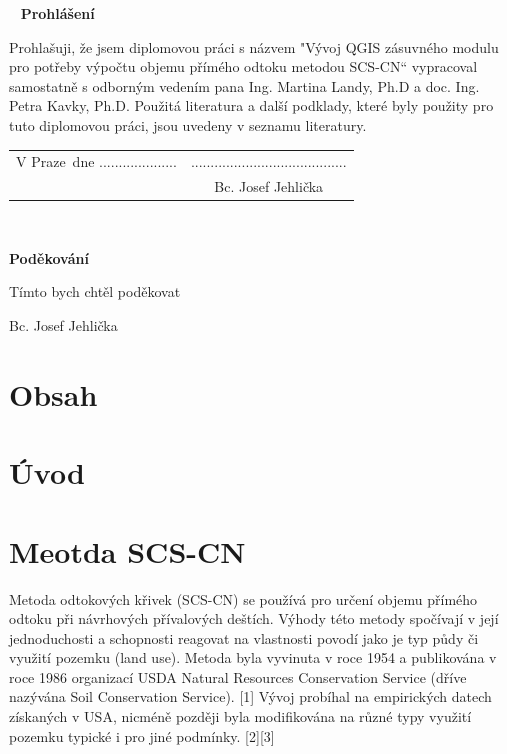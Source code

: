 \documentclass[a4paper,oneside,12pt]{book}
\newcommand{\tb}{\textbf} %
\newcommand{\autor}{Bc. Josef Jehlička}   %
\newcommand{\kde}{Praze} %
\newcommand{\prohlaseni}{Prohlašuji, že jsem diplomovou práci s názvem "Vývoj QGIS zásuvného modulu pro potřeby výpočtu objemu přímého odtoku metodou SCS-CN“ vypracoval samostatně s odborným vedením pana Ing. Martina Landy, Ph.D a doc. Ing. Petra Kavky, Ph.D. Použitá literatura a další podklady, které byly použity pro tuto diplomovou práci, jsou uvedeny v seznamu literatury. 
} %
\newcommand{\podekovani}{Tímto bych chtěl poděkovat } %
\begin{document}
\newpage %
\thispagestyle{empty}  %

~ %
\vfill %
\vspace{1em}
\tb{Prohlášení} %

\vspace{1em} %
\prohlaseni

\vspace{2em}  %
\hspace{-0.5em}\begin{tabularx}{\textwidth}{X c}  %
V \kde\ dne .................... &........................................ \\	%
	& \autor
\end{tabularx}	%







\newpage %
\thispagestyle{empty}  %

~
\vfill %


\vspace{1em}
\tb{Poděkování}

\vspace{1em} %
\podekovani
\begin{flushright}
\autor
\end{flushright}  %





\newpage
\chapter*{Obsah}




\newpage
\chapter*{Úvod} \label{uvod}

\newpage
\chapter{Meotda SCS-CN} \label{SCSCN}
\hspace{10mm} Metoda odtokových křivek (SCS-CN) se používá pro určení objemu přímého odtoku při návrhových přívalových deštích. Výhody této metody spočívají v její jednoduchosti a schopnosti reagovat na vlastnosti povodí jako je typ půdy či využití pozemku (land use). Metoda byla vyvinuta v roce 1954 a publikována v roce 1986 organizací USDA Natural Resources Conservation Service (dříve nazývána Soil Conservation Service). [1] Vývoj probíhal na empirických datech získaných v USA, nicméně později byla modifikována na různé typy využití pozemku typické i pro jiné podmínky. [2][3]
\end{document}
